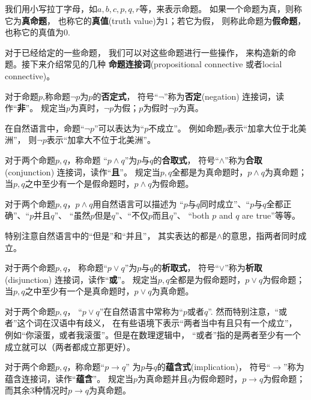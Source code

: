 我们用小写拉丁字母，如$a,b,c,p,q,r$等，来表示命题。
如果一个命题为真，则称它为\textbf{真命题}，
也称它的\textbf{真值}(truth value)为1；若它为假，
则称此命题为\textbf{假命题}，也称它的真值为0.
\vsp

对于已经给定的一些命题，
我们可以对这些命题进行一些操作，
来构造新的命题。接下来介绍常见的几种
\textbf{命题连接词}(propositional connective 或者locial connective)。

\begin{definition}[否定连接词]
对于命题$p$,称命题$\neg p$为$p$的\textbf{否定式}，
符号“$\neg$”称为\textbf{否定}(negation)
连接词，读作“\textbf{非}”。
规定当$p$为真时，$\neg p$为假；$p$为假时$\neg p$为真。
\end{definition}

在自然语言中，命题“$\neg p$”可以表达为“$p$不成立”。
例如命题$p$表示“加拿大位于北美洲”，
则$\neg p$表示“加拿大不位于北美洲”。

\begin{definition}[合取连接词]
对于两个命题$p,q$，称命题
“$p\wedge q$”为$p$与$q$的\textbf{合取式}，
符号“$\wedge$”称为\textbf{合取}(conjunction)
连接词，读作“\textbf{且}”。
规定当$p,q$全都是为真命题时，$p\wedge q$为真命题；
当$p,q$之中至少有一个是假命题时，$p\wedge q$为假命题。
\end{definition}
对于两个命题$p,q$，$p\wedge q$用自然语言可以描述为
“$p$与$q$同时成立”、“$p$与$q$全都正确”、“$p$并且$q$”、
“虽然$p$但是$q$”、“不仅$p$而且$q$”、
“both $p$ and $q$ are true”等等。

特别注意自然语言中的“但是”和“并且”，
其实表达的都是$\wedge$的意思，指两者同时成立。

\begin{definition}[析取连接词]
对于两个命题$p,q$，
称命题“$p\vee q$”为$p$与$q$的\textbf{析取式}，
符号“$\vee$”称为\textbf{析取}(disjunction)
连接词，读作“\textbf{或}”。
规定当$p,q$全都是为假命题时，$p\vee q$为假命题；
当$p,q$之中至少有一个是真命题时，$p\vee q$为真命题。
\end{definition}
对于两个命题$p,q$，
“$p\vee q$”在自然语言中常称为“$p$或者$q$”.
然而特别注意，“或者”这个词在汉语中有歧义，
在有些语境下表示“两者当中有且只有一个成立”，
例如“你滚蛋，或者我滚蛋”。但是在数理逻辑中，
“或者”指的是两者至少有一个成立就可以（两者都成立那更好）。

\begin{definition}[蕴含连接词]
对于两个命题$p,q$，称命题“$p\rightarrow q$”
为$p$与$q$的\textbf{蕴含式}(implication)，
符号“$\rightarrow$”称为蕴含连接词，读作“\textbf{蕴含}”。
规定当$p$为真命题并且$q$为假命题时，$p\rightarrow q$为假命题；
而其余3种情况时$p\rightarrow q$为真命题。
\end{definition}

